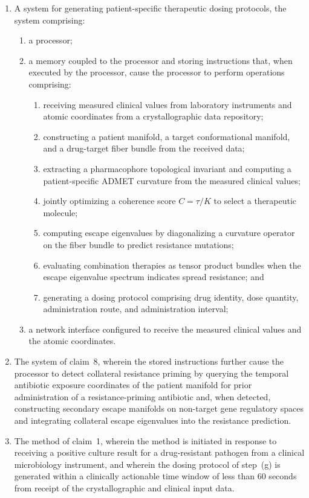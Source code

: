 \documentclass[11pt]{article}
\begin{document}
\begin{enumerate}[label=\textbf{\arabic*.}, leftmargin=*, itemsep=1em]
\item A system for generating patient-specific therapeutic dosing protocols, the system
comprising:
\begin{enumerate}[label=(\alph*)]
    \item a processor;
    \item a memory coupled to the processor and storing instructions that, when executed by
    the processor, cause the processor to perform operations comprising:
    \begin{enumerate}[label=(\roman*)]
        \item receiving measured clinical values from laboratory instruments and atomic
        coordinates from a crystallographic data repository;
        \item constructing a patient manifold, a target conformational manifold, and a
        drug-target fiber bundle from the received data;
        \item extracting a pharmacophore topological invariant and computing a patient-specific
        ADMET curvature from the measured clinical values;
        \item jointly optimizing a coherence score $C = \tau/K$ to select a therapeutic molecule;
        \item computing escape eigenvalues by diagonalizing a curvature operator on the
        fiber bundle to predict resistance mutations;
        \item evaluating combination therapies as tensor product bundles when the escape
        eigenvalue spectrum indicates spread resistance; and
        \item generating a dosing protocol comprising drug identity, dose quantity,
        administration route, and administration interval;
    \end{enumerate}
    \item a network interface configured to receive the measured clinical values and the
    atomic coordinates.
\end{enumerate}

\item The system of claim~8, wherein the stored instructions further cause the processor to
detect collateral resistance priming by querying the temporal antibiotic exposure coordinates
of the patient manifold for prior administration of a resistance-priming antibiotic and, when
detected, constructing secondary escape manifolds on non-target gene regulatory spaces and
integrating collateral escape eigenvalues into the resistance prediction.

\item The method of claim~1, wherein the method is initiated in response to receiving a
positive culture result for a drug-resistant pathogen from a clinical microbiology instrument,
and wherein the dosing protocol of step~(g) is generated within a clinically actionable time
window of less than 60 seconds from receipt of the crystallographic and clinical input data.

\end{enumerate}
\end{document}
